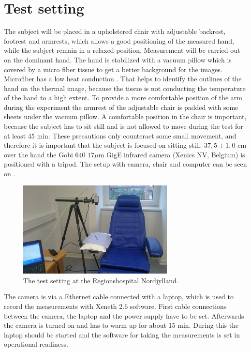 \section{Test setting}

The subject will be placed in a upholstered chair with adjustable backrest, footrest and armrests, which allows a good positioning of the measured hand, while the subject remain in a relaxed position. Measurement will be carried out on the dominant hand. The hand is stabilized with a vacuum pillow which is covered by a micro fiber tissue to get a better background for the images. Microfiber has a low heat conduction \cite{schacher2000}. That helps to identify the outlines of the hand on the thermal image, because the tissue is not conducting the temperature of the hand to a high extent. To provide a more comfortable position of the arm during the experiment the armrest of the adjustable chair is padded with some sheets under the vacuum pillow. A comfortable position in the chair is important, because the subject has to sit still and is not allowed to move during the test for at least 45 min. These precautions only counteract some small movement, and therefore it is important that the subject is focused on sitting still. 
$37,5\pm 1,0$ cm over the hand the Gobi $640$ $17\mu$m GigE infrared camera (Xenics NV, Belgium) is positioned with a tripod. The setup with camera, chair and computer can be seen on . 


\begin{figure}[H]
	\includegraphics[width=0.7\textwidth]{figures/setting}
	\caption{The test setting at the Regionshospital Nordjylland.}
	\label{fig:setting}
\end{figure}

The camera is via a Ethernet cable connected with a laptop, which is used to record the measurements with Xeneth 2.6 software. 
First cable connections between the camera, the laptop and the power supply have to be set. Afterwards the camera is turned on and has to warm up for about 15 min. During this the laptop should be started and the software for taking the measurements is set in operational readiness.

